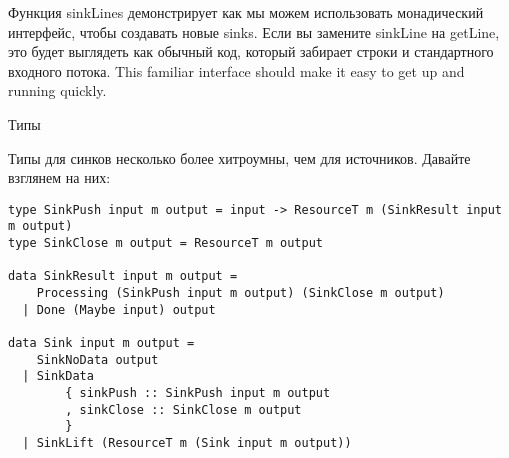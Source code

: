 Функция sinkLines демонстрирует как мы можем использовать монадический интерфейс,
чтобы создавать новые sinks. Если вы замените sinkLine на getLine, это будет выглядеть
как обычный код, который забирает строки и стандартного входного потока. This familiar
interface should make it easy to get up and running quickly.

Типы

Типы для синков несколько более хитроумны, чем для источников. Давайте взглянем на них:

\begin{lstlisting}
type SinkPush input m output = input -> ResourceT m (SinkResult input m output)
type SinkClose m output = ResourceT m output

data SinkResult input m output =
    Processing (SinkPush input m output) (SinkClose m output)
  | Done (Maybe input) output

data Sink input m output =
    SinkNoData output
  | SinkData
        { sinkPush :: SinkPush input m output
        , sinkClose :: SinkClose m output
        }
  | SinkLift (ResourceT m (Sink input m output))
\end{lstlisting}  
% 
% 
